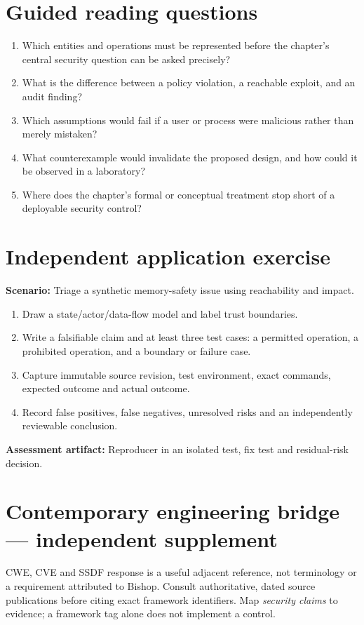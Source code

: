 \documentclass[10pt,letterpaper]{article}
\begin{document}
\section{Guided reading questions}
\begin{enumerate}
\item Which entities and operations must be represented before the chapter's central security question can be asked precisely?
\item What is the difference between a policy violation, a reachable exploit, and an audit finding?
\item Which assumptions would fail if a user or process were malicious rather than merely mistaken?
\item What counterexample would invalidate the proposed design, and how could it be observed in a laboratory?
\item Where does the chapter's formal or conceptual treatment stop short of a deployable security control?
\end{enumerate}
\section{Independent application exercise}
\textbf{Scenario:} Triage a synthetic memory-safety issue using reachability and impact.
\begin{enumerate}
\item Draw a state/actor/data-flow model and label trust boundaries.
\item Write a falsifiable claim and at least three test cases: a permitted operation, a prohibited operation, and a boundary or failure case.
\item Capture immutable source revision, test environment, exact commands, expected outcome and actual outcome.
\item Record false positives, false negatives, unresolved risks and an independently reviewable conclusion.
\end{enumerate}
\textbf{Assessment artifact:} Reproducer in an isolated test, fix test and residual-risk decision.
\section{Contemporary engineering bridge --- independent supplement}
CWE, CVE and SSDF response is a useful adjacent reference, not terminology or a requirement attributed to Bishop. Consult authoritative, dated source publications before citing exact framework identifiers. Map \emph{security claims} to evidence; a framework tag alone does not implement a control.
\end{document}
